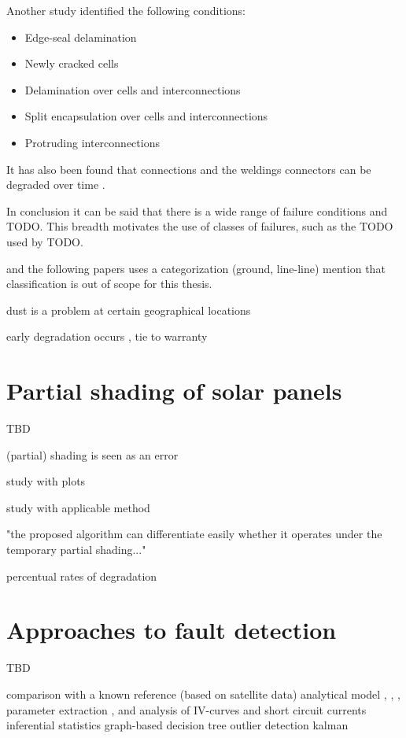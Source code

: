 Another study\cite{Forman1982} identified the following conditions:
\begin{itemize}
\item Edge-seal delamination
\item Newly cracked cells
\item Delamination over cells and interconnections
\item Split encapsulation over cells and interconnections
\item Protruding interconnections
\end{itemize}

It has also been found that connections and the weldings connectors can be degraded over time \cite{Houssein2010}.

In conclusion it can be said that there is a wide range of failure conditions and TODO.
This breadth motivates the use of classes of failures, such as the TODO used by TODO. 

\cite{Zhao2010thesis} and the following papers \cite{Zhao2012tree,Zhao2013graph,Zhao2013outlier} uses a categorization (ground, line-line)
mention that classification is out of scope for this thesis.

dust is a problem \cite{Mani2010} at certain geographical locations

early degradation occurs \cite{Munoz2011}, tie to warranty

\section{Partial shading of solar panels}
TBD

(partial) shading is seen as an error \cite{Stettler2005} %

study with plots \cite{Alsayid2013} 

study with applicable method \cite{Firth2010}

"the proposed algorithm can differentiate easily whether it operates under the temporary partial shading..." \cite{Kang2012}

percentual rates of degradation \cite{Quintana2002}

\section{Approaches to fault detection}
TBD

comparison with a known reference (based on satellite data) \cite{Stettler2005}
analytical model \cite{Chouder2010}, \cite{Raina2013}, \cite{Chao2008}, parameter extraction \cite{Eicker2005}, \cite{Chouder2009} and \cite{Walker2001}
analysis of IV-curves and short circuit currents \cite{Meyer2004}
inferential statistics \cite{Vergura2008,Vergura2009}
graph-based \cite{Zhao2013graph}
decision tree \cite{Zhao2012tree}
outlier detection \cite{Zhao2013outlier}
kalman \cite{Kang2012}

